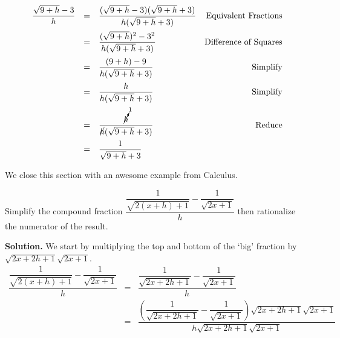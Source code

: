 \documentclass{ximera}
\begin{document}
{{{{\begin{example}
\begin{enumerate}
\[\begin{array}{rclr}
\dfrac{\sqrt{9 + h} - 3}{h} & = & \dfrac{(\sqrt{9 + h} - 3)(\sqrt{9 + h} + 3)}{h(\sqrt{9 + h} + 3)} & \text{Equivalent Fractions} \\[12pt]

                             & = & \dfrac{(\sqrt{9+h})^2 - 3^2}{h(\sqrt{9 + h} + 3)} & \text{Difference of Squares} \\[12pt]
														 & = & \dfrac{(9+h) - 9}{h(\sqrt{9 + h} + 3)} & \text{Simplify} \\[12pt]
														 & = & \dfrac{h}{h(\sqrt{9 + h} + 3)} & \text{Simplify} \\[12pt]
														 & = & \dfrac{\cancelto{1}{h}}{\cancel{h}(\sqrt{9 + h} + 3)} & \text{Reduce}\\[12pt]
														& = & \dfrac{1}{\sqrt{9 + h} + 3} & \\

\end{array} \]

\end{enumerate}

\end{example}

We close this section with an awesome example from Calculus.%

\begin{example} \label{rationalizenumdenombosslevel}

Simplify the compound fraction $\dfrac{\dfrac{1}{\sqrt{2(x+h)+1}} - \dfrac{1}{\sqrt{2x+1}}}{h}$ then rationalize the numerator of the result.

\medskip

{\bf Solution.} We start by multiplying the top and bottom of the `big' fraction by $\sqrt{2x+2h+1} \sqrt{2x+1}$.  \[ \begin{array}{rcl}

\dfrac{\dfrac{1}{\sqrt{2(x+h)+1}} - \dfrac{1}{\sqrt{2x+1}}}{h} & = & \dfrac{\dfrac{1}{\sqrt{2x+2h+1}} - \dfrac{1}{\sqrt{2x+1}}}{h}\\[10pt]

                                                               & = & \dfrac{\left(\dfrac{1}{\sqrt{2x+2h+1}} - \dfrac{1}{\sqrt{2x+1}}\right) \sqrt{2x+2h+1} \sqrt{2x+1}}{h\sqrt{2x+2h+1} \sqrt{2x+1}}\\[22pt]
																															

\end{array}\]
\end{example}}}}}
\end{document}

